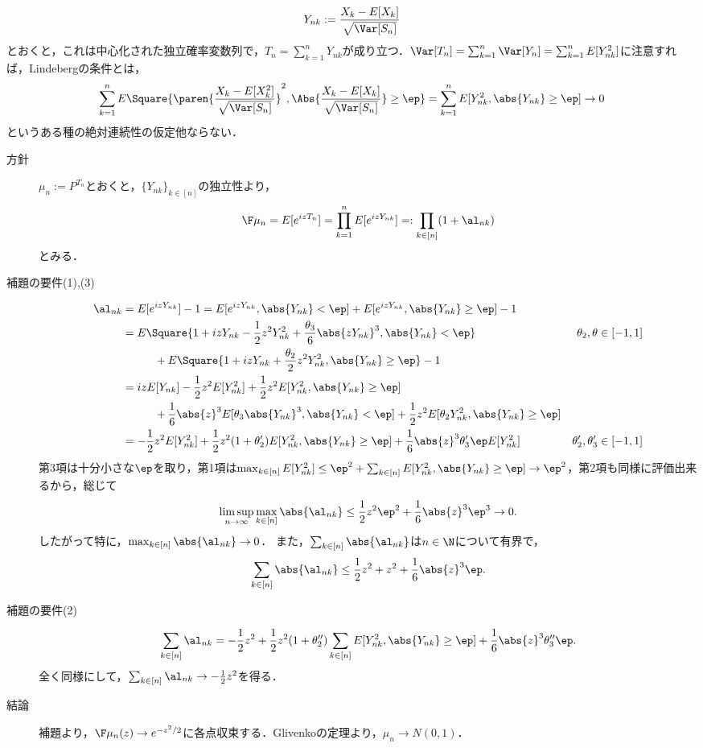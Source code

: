 \documentclass[uplatex,dvipdfmx]{jsreport}
\begin{document}
\begin{Proof}
    \[Y_{nk}:=\frac{X_k-E[X_k]}{\sqrt{\Var[S_n]}}\]
    とおくと，これは中心化された独立確率変数列で，$T_n=\sum_{k=1}^nY_{nk}$が成り立つ．$\Var[T_n]=\sum_{k=1}^n\Var[Y_n]=\sum^n_{k=1}E[Y_{nk}^2]$に注意すれば，Lindebergの条件とは，
    \[\sum^n_{k=1}E\Square{\paren{\frac{X_k-E[X_k^2]}{\sqrt{\Var[S_n]}}}^2,\Abs{\frac{X_k-E[X_k]}{\sqrt{\Var[S_n]}}}\ge\ep}=\sum^n_{k=1}E[Y_{nk}^2,\abs{Y_{nk}}\ge\ep]\to0\]
    というある種の絶対連続性の仮定他ならない．
    \begin{description}
        \item[方針] $\mu_n:=P^{T_n}$とおくと，$\{Y_{nk}\}_{k\in[n]}$の独立性より，\[\F\mu_n=E[e^{izT_n}]=\prod^n_{k=1}E[e^{izY_{nk}}]=:\prod_{k\in[n]}(1+\al_{nk})\]とみる．
        \item[補題の要件(1),(3)] \begin{align*}
            \al_{nk}&=E[e^{izY_{nk}}]-1=E[e^{izY_{nk}},\abs{Y_{nk}}<\ep]+E[e^{izY_{nk}},\abs{Y_{nk}}\ge\ep]-1\\
            &=E\Square{1+izY_{nk}-\frac{1}{2}z^2Y^2_{nk}+\frac{\theta_3}{6}\abs{zY_{nk}}^3,\abs{Y_{nk}}<\ep}&\theta_2,\theta\in[-1,1]\\
            &\hspace{1cm}+E\Square{1+izY_{nk}+\frac{\theta_2}{2}z^2Y_{nk}^2,\abs{Y_{nk}}\ge\ep}-1\\
            &=izE[Y_{nk}]-\frac{1}{2}z^2E[Y_{nk}^2]+\frac{1}{2}z^2E[Y_{nk}^2,\abs{Y_{nk}}\ge\ep]\\
            &\hspace{1cm}+\frac{1}{6}\abs{z}^3E[\theta_3\abs{Y_{nk}}^3,\abs{Y_{nk}}<\ep]+\frac{1}{2}z^2E[\theta_2Y^2_{nk},\abs{Y_{nk}}\ge\ep]\\
            &=-\frac{1}{2}z^2E[Y_{nk}^2]+\frac{1}{2}z^2(1+\theta_2')E[Y_{nk}^2,\abs{Y_{nk}}\ge\ep]+\frac{1}{6}\abs{z}^3\theta_3'\ep E[Y_{nk}^2]&\theta_2',\theta_3'\in[-1,1]
        \end{align*}
        第3項は十分小さな$\ep$を取り，第1項は$\max_{k\in[n]}E[Y_{nk}^2]\le\ep^2+\sum_{k\in[n]}E[Y_{nk}^2,\abs{Y_{nk}}\ge\ep]\to\ep^2$，第2項も同様に評価出来るから，総じて
        \[\limsup_{n\to\infty}\max_{k\in[n]}\abs{\al_{nk}}\le\frac{1}{2}z^2\ep^2+\frac{1}{6}\abs{z}^3\ep^3\to0.\]
        したがって特に，$\max_{k\in[n]}\abs{\al_{nk}}\to0$．
        また，$\sum_{k\in[n]}\abs{\al_{nk}}$は$n\in\N$について有界で，
        \[\sum_{k\in[n]}\abs{\al_{nk}}\le\frac{1}{2}z^2+z^2+\frac{1}{6}\abs{z}^3\ep.\]
        \item[補題の要件(2)] 
        \[\sum_{k\in[n]}\al_{nk}=-\frac{1}{2}z^2+\frac{1}{2}z^2(1+\theta_2'')\sum_{k\in[n]}E[Y_{nk}^2,\abs{Y_{nk}}\ge\ep]+\frac{1}{6}\abs{z}^3\theta_3''\ep.\]
        全く同様にして，$\sum_{k\in[n]}\al_{nk}\to-\frac{1}{2}z^2$を得る．
        \item[結論] 補題より，$\F\mu_n(z)\to e^{-z^2/2}$に各点収束する．Glivenkoの定理より，$\mu_n\to N(0,1)$．
    \end{description}
\end{Proof}
\end{document}
